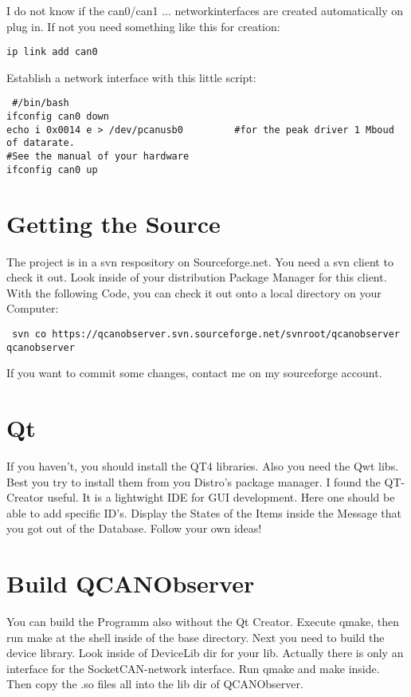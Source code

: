 \documentclass[a4paper,10pt]{article}
\begin{document}
I do not know if the can0/can1 ... networkinterfaces are created automatically on plug in. If not 
you need something like this for creation:
\begin{verbatim}     
ip link add can0
\end{verbatim} 

Establish a network interface with this little script:
\begin{verbatim}
 #/bin/bash
ifconfig can0 down
echo i 0x0014 e > /dev/pcanusb0			#for the peak driver 1 Mboud of datarate. 
#See the manual of your hardware
ifconfig can0 up
\end{verbatim} 


\section{Getting the Source}

The project is in a svn respository on Sourceforge.net.
You need a svn client to check it out. Look inside of your distribution Package Manager for this client.
With the following Code, you can check it out onto a local directory on your Computer:
\begin{verbatim}
 svn co https://qcanobserver.svn.sourceforge.net/svnroot/qcanobserver qcanobserver 
\end{verbatim} 

If you want to commit some changes, contact me on my sourceforge account. 

\section{Qt}
If you haven't, you should install the QT4 libraries. Also you need the Qwt libs. Best you try to install them from you Distro's package manager.
I found the QT-Creator useful. It is a lightwight IDE for GUI development.
Here one should be able to add specific ID's. Display the States of the Items inside the Message that you got out of the Database.
Follow your own ideas!

\section{Build QCANObserver}
You can build the Programm also without the Qt Creator. Execute qmake, then run make at the shell inside of the base directory.
Next you need to build the device library. Look inside of DeviceLib dir for your lib. Actually there is only an interface for the SocketCAN-network interface.
Run qmake and make inside. Then copy the .so files all into the lib dir of QCANObserver.
\end{document}
